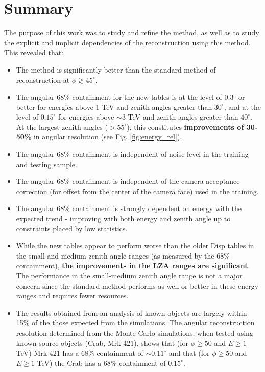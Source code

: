 \documentclass[main.tex]{subfiles}
\begin{document}
\section{Summary}
The purpose of this work was to study and refine the \disp method, as well as to study the explicit and implicit dependencies of the reconstruction using this method. This revealed that:

\begin{itemize}
\item The \disp method is significantly better than the standard method of reconstruction at $\phi\gtrsim45^\circ$.
\item The angular 68\% containment for the new \disp tables is at the level of $0.3^\circ$ or better for energies above 1 TeV and zenith angles greater than $30^\circ$, and at the level of $0.15^\circ$ for energies above $\sim$3 TeV and zenith angles greater than $40^\circ$. At the largest zenith angles ($>55^\circ$), this constitutes {\bf improvements of 30-50\%} in angular resolution (see Fig. \ref{fig:energy_rel}).
\item The angular 68\% containment is independent of noise level in the training and testing sample.
\item The angular 68\% containment is independent of the camera acceptance correction (for offset from the center of the camera face) used in the training.
\item The angular 68\% containment is strongly dependent on energy with the expected trend - improving with both energy and zenith angle up to constraints placed by low statistics.
\item While the new \disp tables appear to perform worse than the older Disp tables in the small and medium zenith angle ranges (as measured by the 68\% containment), \textbf{the improvements in the LZA ranges are significant}. The performance in the small-medium zenith angle range is not a major concern since the standard method performs as well or better in these energy ranges and requires fewer resources.
\item The results obtained from an analysis of known objects are largely within 15\% of the those expected from the simulations. The angular reconstruction resolution determined from the Monte Carlo simulations, when tested using known source objects (Crab, Mrk 421), shows that (for $\phi\geq50$ and $E\geq 1$ TeV) Mrk 421 has a 68\% containment of $\sim 0.11^\circ$ and that (for $\phi\geq50$ and $E\geq 1$ TeV) the Crab has a 68\% containment of $0.15^\circ$.
\end{itemize}
\end{document}
